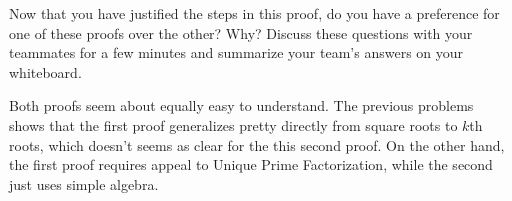 \documentclass[handout]{mcs}
\begin{document}
\begin{problem}
\begin{solution}
\begin{enumerate}
\end{enumerate}
\end{solution}

\ppart Now that you have justified the steps in this proof, do you have a
preference for one of these proofs over the other?  Why?  Discuss these
questions with your teammates for a few minutes and summarize your team's
answers on your whiteboard.

\begin{solution}
Both proofs seem about equally easy to understand.  The previous
  problems shows that the first proof generalizes pretty directly from
  square roots to $k$th roots, which doesn't seems as clear for the this
  second proof.  On the other hand, the first proof requires appeal to
  Unique Prime Factorization, while the second just uses simple algebra.
\end{solution}

\eparts
\end{problem}

\end{document}
